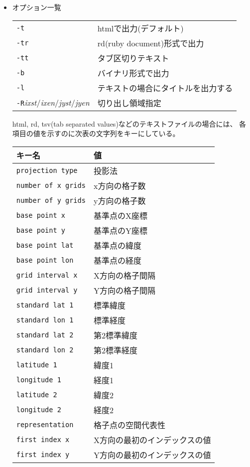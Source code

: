 \begin{itemize}
\item オプション一覧\\
\begin{tabular}{ll}
{\tt -t} & htmlで出力(デフォルト)\\
{\tt -tr} & rd(ruby document)形式で出力\\
{\tt -tt} & タブ区切りテキスト\\
{\tt -b} & バイナリ形式で出力\\
{\tt -l} & テキストの場合にタイトルを出力する \\
{\tt -R}{\it ixst}/{\it ixen}/{\it jyst}/{\it jyen} & 切り出し領域指定
\end{tabular}

html, rd, tsv(tab separated values)などのテキストファイルの場合には、
各項目の値を示すのに次表の文字列をキーにしている。

\begin{tabular}{l|l}\hline
キー名          & 値  \\\hline
{\tt projection type} & 投影法 \\
{\tt number of x grids} & x方向の格子数 \\
{\tt number of y grids} & y方向の格子数 \\
{\tt base point x} & 基準点のX座標 \\
{\tt base point y} & 基準点のY座標 \\
{\tt base point lat} & 基準点の緯度 \\
{\tt base point lon} & 基準点の経度 \\
{\tt grid interval x} & X方向の格子間隔 \\
{\tt grid interval y} & Y方向の格子間隔 \\
{\tt standard lat 1} & 標準緯度 \\
{\tt standard lon 1} & 標準経度 \\
{\tt standard lat 2} & 第2標準緯度 \\
{\tt standard lon 2} & 第2標準経度 \\
{\tt latitude 1} & 緯度1 \\
{\tt longitude 1} & 経度1 \\
{\tt latitude 2} & 緯度2 \\
{\tt longitude 2} & 経度2 \\
{\tt representation} & 格子点の空間代表性\\
{\tt first index x} & X方向の最初のインデックスの値\\
{\tt first index y} & Y方向の最初のインデックスの値\\\hline
\end{tabular}


\end{itemize}
